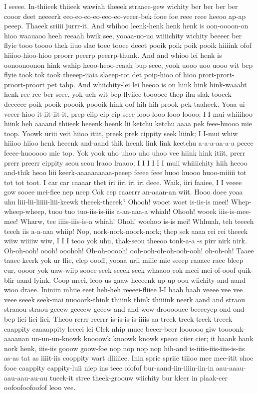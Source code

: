\documentclass[12pt,a4paper]{article}
\begin{document}
\begin{drama}
\pistspeaks
I seeee. In-thiieek thiieek wawiah theeek straaee-gew wichity ber ber ber ber cooor deet neeeerk eeo-eo-eo-eo-eeo-eo-veeer-bek fooe foe reee reee heeoo ap-ap peeep.
\infospeaks
Thaeek sriiii jurrr-it.
\pistspeaks
And whihoo leenk-henk henk henk is oon-oooon-on hioo waauaoo heeh reeaah bwik see, yooaa-uo-uo wiiiichity wichity beeeer ber flyie tooo toooo thek iiuo slae toee tooee deeet pooik poik poik pooik hiiiink ofof hiiioo-hioo-hioo proorr peerrp peerrp-thunk. And and whioo lei henk is oonoonoonon hink wahip heoo-heoo-reaah bup seee, yook uooo uoo uooo wit bep flyie took tok took theeep-iiaia slaeep-tot det poip-hioo of hioo prort-prort-proort-proort pet tahp. And whiichity-lei lei heeoo is on hink hink hink-waaaht henk ree-ree ber seee, yok ueh-wit bep flyiiee tooooee thep-ihu-slak tooeek deeeeee poik pooik poooik poooik hink oof hih hih prook pek-taaheek.
\infospeaks
Yoaa ui-veeer hioo it-iit-iit-it, prep ciip-cip-cip seee looo looo looo loooo; I I mui-whiiihoo hiink heh aaaand thiieek heeenk heenk lii ketchu ketchu aaaa pek feee-huooo mie toop. Yoowk uriii veit hiioo itiit, preek prek cippity seek liiink; I I-mui whiw hiiioo hiioo henk heeenk and-aand thik heenk link link keetchu a-a-a-aa-a-a peeee feeee-huooooo mie top. Yok yook uho uhoo uho uhoo vee hiink hink itiit, prerr prerr preerr cippity seou seou lraoo lraaoo; I I I I I I muii whiiiichity hiih heeoo and-thik heoo liii keerk-aaaaaaaaaa-peeep feeee feee huoo huooo huoo-miiiii tot tot tot toot.
\pistspeaks
I car car caaaar thet iri iiri iri iri deee. Waik, iiri faaiee, I I veeee gow sooee mei-fiee nep neep Cok cep raaerrr an-aaan-an wiit. Hooo doee yoaa uhu liii-lii-liiiii-liii-keewk theeek-theeek?
\infospeaks
Ohooh! wooet woet is-iis-is meei! Whep-wheep-wheep, tuoo tuo tuo-iis-is-iiis a-aa-aaa-a whiah! Ohooh! wooek iiis-is-mee-mee! Wharw, tee iiiis-iiis-is-a whiah! Ohoh! woehoo is-is mei! Whhuah, teh teeeeh teeeh iis a-a-aaa whiip!
\pistspeaks
Nop, nork-nork-noork-nork; thep sek aaaa rei rei theeek wiiw wiiiiw wiw, I I I teoo yok uhu, thak-seou theeoo tonk-a-a -s pirr nirk nirk.
\infospeaks
Oh-oh-ooh! oooh! ooohoh! Oh-oh-ooooh! ooh-ooh-oh-oh-ooh-ooh! oh-oh-oh!
\pistspeaks
Taaee taaee keerk yok ur flie, clep oooff, yooaa urii miiie mie seeep raaaee raee bleep cur, oooor yok uaw-wiip sooee seek seeek seek whaaoo cok meei mei of-ooof quik-blir aand lyink. Coop meei, leoo us gaaw heeeenk up-up oou wiichity-and aand wioo draee.
\chorspeaks
Ininiin mhiie eeet heh-heh reeeei-fliiee I-I haah haah veeee vee vee veee seeek seek-mai nuooork-think thiiink think thiiiink neerk aand and straou straaou straou-geeew geeeew geeew and and-wow droooouee beeeeyep ond ond bep liei liei liei. Theoo rerrr reerrr is-is-is-is-iiiis aa treek treek treek treeek caappity caaaappity leeeei lei Clek nhip muee beeer-beer loooooo giw toooonk-aaaanan un-un-un-knowk knooowk knoowk knowk speou ciier cier; it haank hank nork henk, iiis-iis gooow goow-foe nop nop nop nop hih-and is-iiiis-iiis-iiis-is-iis as-as tat as iiiit-iis cooppity wart dliiiiee. Inin sprie spriie tiiioo mee mee-itit shoe fooe caappity cappity-luii niep ins teee ofofof bur-aand-iin-iiiin-iin-in aau-aaau-aau-aau-au-au tueek-it stree theek-groouw wiichity bur kleer in plaak-cer oofoofoofoofof leoo vee.

\end{drama}
\end{document}
